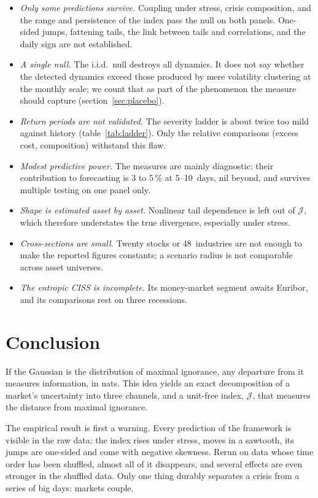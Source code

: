 \documentclass[11pt]{article}
\theoremstyle{definition}
\newcommand{\JJ}{\mathcal{J}}
\begin{document}
\begin{itemize}
\item \emph{Only some predictions survive.} Coupling under stress, crisis
composition, and the range and persistence of the index pass the null on both
panels. One-sided jumps, fattening tails, the link between tails and
correlations, and the daily sign are not established.
\item \emph{A single null.} The i.i.d.\ null destroys all dynamics. It does not
say whether the detected dynamics exceed those produced by mere volatility
clustering at the monthly scale; we count that as part of the phenomenon the
measure should capture (section~\ref{sec:placebo}).
\item \emph{Return periods are not validated.} The severity ladder is about
twice too mild against history (table~\ref{tab:ladder}). Only the relative
comparisons (excess cost, composition) withstand this flaw.
\item \emph{Modest predictive power.} The measures are mainly diagnostic:
their contribution to forecasting is $3$ to $5\,\%$ at 5--10~days, nil beyond,
and survives multiple testing on one panel only.
\item \emph{Shape is estimated asset by asset.} Nonlinear tail dependence is
left out of $\JJ$, which therefore understates the true divergence, especially
under stress.
\item \emph{Cross-sections are small.} Twenty stocks or 48~industries are not
enough to make the reported figures constants; a scenario radius is not
comparable across asset universes.
\item \emph{The entropic CISS is incomplete.} Its money-market segment awaits
Euribor, and its comparisons rest on three recessions.
\end{itemize}

\section{Conclusion}
\label{sec:conclusion}

If the Gaussian is the distribution of maximal ignorance, any departure from
it measures information, in nats. This idea yields an exact decomposition of a
market's uncertainty into three channels, and a unit-free index, $\JJ$, that
measures the distance from maximal ignorance.

The empirical result is first a warning. Every prediction of the framework is
visible in the raw data: the index rises under stress, moves in a sawtooth,
its jumps are one-sided and come with negative skewness. Rerun on data whose
time order has been shuffled, almost all of it disappears, and several effects
are even stronger in the shuffled data. Only one thing durably separates a
crisis from a series of big days: markets couple.
\end{document}
